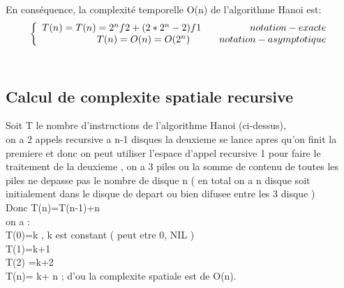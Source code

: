 En conséquence, la complexité temporelle O(n) de l'algorithme Hanoi est: \\

  \[ 
\left\{
\begin{array}{r c l}
T(n)= T(n) = 2^nf2 + (2*2^n -2)f1 \quad \quad \quad \quad \quad notation-exacte\\
T(n)=O(n)= O(2^n)\quad \quad \quad notation-asymptotique
\end{array}
\right.
\]
\\
\subsection{Calcul de complexite spatiale recursive}
Soit T le nombre d'instructions de l'algorithme Hanoi (ci-dessus),  \\
on a 2 appels recursive a n-1 disques la deuxieme se lance apres qu'on finit la premiere et donc on peut utiliser l'espace d'appel recursive 1 pour faire le traitement de la deuxieme , on a 3 piles ou la somme de contenu de toutes les piles ne depasse pas le nombre de disque n ( en total on a n disque soit initialement dans le disque de depart ou bien difusee entre les 3 disque )  \\
Donc T(n)=T(n-1)+n\\
on a : \\
T(0)=k , k est constant ( peut etre 0, NIL ) \\
T(1)=k+1\\
T(2) =k+2 \\
T(n)= k+ n  ; d'ou la complexite spatiale est de O(n).

